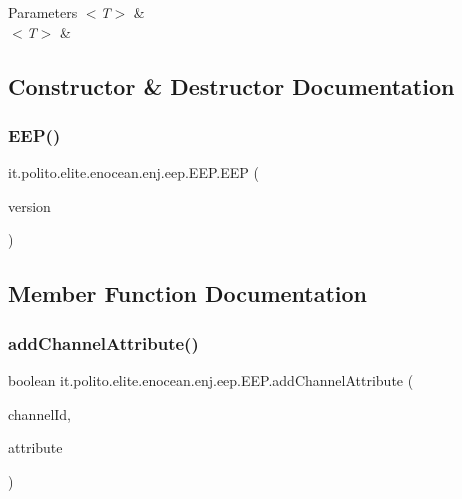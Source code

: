 \begin{DoxyParams}{Parameters}
{\em $<$\+T$>$} & \\
\hline
{\em $<$\+T$>$} & \\
\hline
\end{DoxyParams}


\subsection{Constructor \& Destructor Documentation}
\hypertarget{classit_1_1polito_1_1elite_1_1enocean_1_1enj_1_1eep_1_1_e_e_p_af90cc83eda95bb42ebc188a8a96ee684}{}\label{classit_1_1polito_1_1elite_1_1enocean_1_1enj_1_1eep_1_1_e_e_p_af90cc83eda95bb42ebc188a8a96ee684} 
\subsubsection{\texorpdfstring{E\+E\+P()}{EEP()}}
{\footnotesize\ttfamily it.\+polito.\+elite.\+enocean.\+enj.\+eep.\+E\+E\+P.\+E\+EP (\begin{DoxyParamCaption}\item[{String}]{version }\end{DoxyParamCaption})}



\subsection{Member Function Documentation}
\hypertarget{classit_1_1polito_1_1elite_1_1enocean_1_1enj_1_1eep_1_1_e_e_p_a7d46294504d6741055558a19866fdcc4}{}\label{classit_1_1polito_1_1elite_1_1enocean_1_1enj_1_1eep_1_1_e_e_p_a7d46294504d6741055558a19866fdcc4} 
\subsubsection{\texorpdfstring{add\+Channel\+Attribute()}{addChannelAttribute()}}
{\footnotesize\ttfamily boolean it.\+polito.\+elite.\+enocean.\+enj.\+eep.\+E\+E\+P.\+add\+Channel\+Attribute (\begin{DoxyParamCaption}\item[{Integer}]{channel\+Id,  }\item[{\hyperlink{classit_1_1polito_1_1elite_1_1enocean_1_1enj_1_1eep_1_1_e_e_p_attribute}{E\+E\+P\+Attribute}$<$? extends Object $>$}]{attribute }\end{DoxyParamCaption})}

